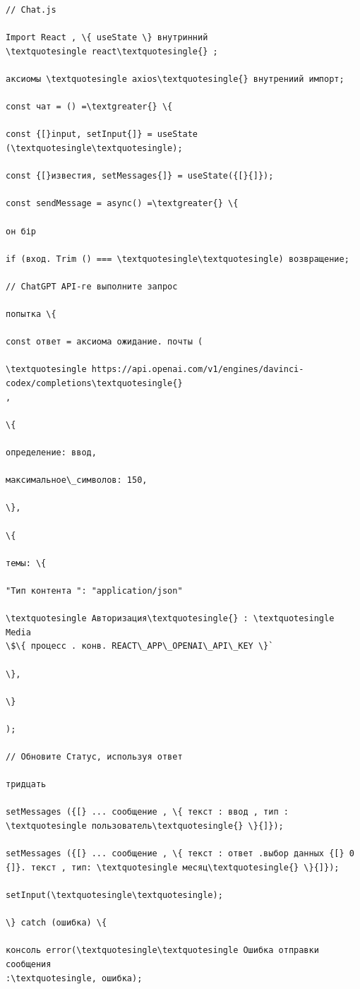 \begin{verbatim}
// Chat.js

Import React , \{ useState \} внутринний
\textquotesingle react\textquotesingle{} ;

аксиомы \textquotesingle axios\textquotesingle{} внутрениий импорт;

const чат = () =\textgreater{} \{

const {[}input, setInput{]} = useState
(\textquotesingle\textquotesingle);

const {[}известия, setMessages{]} = useState({[}{]});

const sendMessage = async() =\textgreater{} \{

он бір

if (вход. Trim () === \textquotesingle\textquotesingle) возвращение;

// ChatGPT API-ге выполните запрос

попытка \{

const ответ = аксиома ожидание. почты (

\textquotesingle https://api.openai.com/v1/engines/davinci-codex/completions\textquotesingle{}
,

\{

определение: ввод,

максимальное\_символов: 150,

\},

\{

темы: \{

"Тип контента ": "application/json"

\textquotesingle Авторизация\textquotesingle{} : \textquotesingle Media
\$\{ процесс . конв. REACT\_APP\_OPENAI\_API\_KEY \}`

\},

\}

);

// Обновите Статус, используя ответ

тридцать

setMessages ({[} ... сообщение , \{ текст : ввод , тип :
\textquotesingle пользователь\textquotesingle{} \}{]});

setMessages ({[} ... сообщение , \{ текст : ответ .выбор данных {[} 0
{]}. текст , тип: \textquotesingle месяц\textquotesingle{} \}{]});

setInput(\textquotesingle\textquotesingle);

\} catch (ошибка) \{

консоль error(\textquotesingle\textquotesingle Ошибка отправки сообщения
:\textquotesingle, ошибка);


\end{verbatim}
